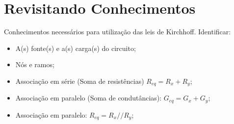 \section{Revisitando Conhecimentos}
Conhecimentos necessários para utilização das leis de Kirchhoff.
Identificar:
\begin{itemize}
  \item A(s) fonte(s) e a(s) carga(s) do circuito;
  \item Nós e ramos;
  \item Associação em série (Soma de resistências) $R_{eq} = R_x + R_y$;
  \item Associação em paralelo (Soma de condutâncias): $G_{eq} = G_x + G_y$;
  \item Associação em paralelo: $R_{eq} = R_x // R_y$;
\end{itemize}
